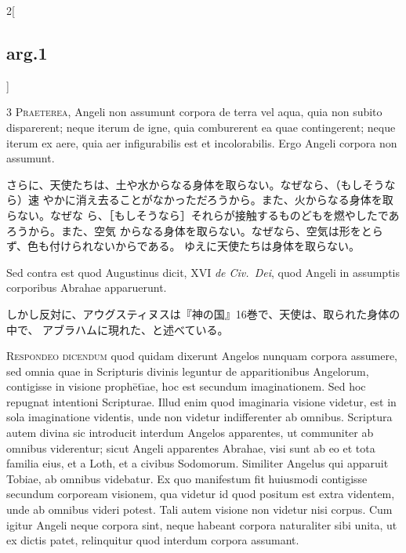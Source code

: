 \documentclass[paper=a4paper,fontsize=10pt,jafontsize=9pt,titlepage]{jlreq}
\begin{document}
\begin{paracol}{2}[\subsection{arg.1}]

{\scshape 3 Praeterea}, Angeli non assumunt corpora de terra vel aqua, quia non
subito disparerent; neque iterum de igne, quia comburerent ea quae contingerent;
neque iterum ex aere, quia aer infigurabilis est et incolorabilis. Ergo Angeli
corpora non assumunt.

\switchcolumn

さらに、天使たちは、土や水からなる身体を取らない。なぜなら、（もしそうなら）速
 やかに消え去ることがなかっただろうから。また、火からなる身体を取らない。なぜな
 ら、［もしそうなら］それらが接触するものどもを燃やしたであろうから。また、空気
 からなる身体を取らない。なぜなら、空気は形をとらず、色も付けられないからである。
 ゆえに天使たちは身体を取らない。

\switchcolumn*[\subsection{s.c.}]

Sed contra est quod Augustinus dicit, XVI {\itshape de
Civ.~Dei}, quod Angeli in assumptis corporibus Abrahae apparuerunt.

\switchcolumn

しかし反対に、アウグスティヌスは『神の国』16巻で、天使は、取られた身体の中で、
 アブラハムに現れた、と述べている。


{\scshape Respondeo dicendum} quod quidam dixerunt
Angelos nunquam corpora assumere, sed omnia quae in Scripturis divinis
leguntur de apparitionibus Angelorum, contigisse in visione proph\={e}t\={\i}ae,
hoc est secundum imaginationem. Sed hoc repugnat intentioni
Scripturae. Illud enim quod imaginaria visione videtur, est in sola
imaginatione videntis, unde non videtur indifferenter ab
omnibus. Scriptura autem divina sic introducit interdum Angelos
apparentes, ut communiter ab omnibus viderentur; sicut Angeli apparentes
Abrahae, visi sunt ab eo et tota familia eius, et a Loth, et a civibus
Sodomorum. Similiter Angelus qui apparuit Tobiae, ab omnibus
videbatur. Ex quo manifestum fit huiusmodi contigisse secundum corpoream
visionem, qua videtur id quod positum est extra videntem, unde ab
omnibus videri potest. Tali autem visione non videtur nisi corpus. Cum
igitur Angeli neque corpora sint, neque habeant corpora naturaliter sibi
unita, ut ex dictis patet, relinquitur quod interdum corpora assumant.


\end{paracol}
\end{document}
